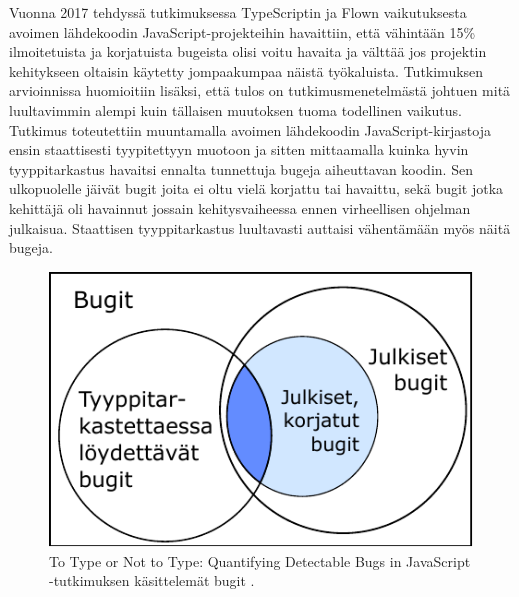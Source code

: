 Vuonna 2017 tehdyssä tutkimuksessa \cite{ToTypeOrNotToType} TypeScriptin
ja Flown vaikutuksesta avoimen
lähdekoodin JavaScript-projekteihin havaittiin, että vähintään 15\%
ilmoitetuista ja korjatuista bugeista olisi voitu havaita ja välttää jos
projektin kehitykseen oltaisin käytetty jompaakumpaa näistä työkaluista.
Tutkimuksen arvioinnissa huomioitiin lisäksi, että tulos on tutkimusmenetelmästä
johtuen mitä luultavimmin alempi kuin tällaisen muutoksen tuoma todellinen
vaikutus. Tutkimus toteutettiin muuntamalla avoimen lähdekoodin
JavaScript-kirjastoja ensin staattisesti tyypitettyyn muotoon ja sitten
mittaamalla kuinka hyvin tyyppitarkastus havaitsi ennalta tunnettuja bugeja
aiheuttavan koodin. Sen ulkopuolelle jäivät bugit joita ei oltu vielä
korjattu tai havaittu, sekä bugit jotka kehittäjä oli havainnut jossain
kehitysvaiheessa ennen virheellisen ohjelman julkaisua. Staattisen
tyyppitarkastus luultavasti auttaisi vähentämään myös näitä bugeja.

\begin{figure}
\centering
\includegraphics{images/to_type_or_not_to_type_venn.pdf}
\caption{To Type or Not to Type: Quantifying Detectable Bugs in JavaScript
         -tutkimuksen käsittelemät bugit \cite{ToTypeOrNotToType}.}
\label{fig:ToTypeOrNotToType}
\end{figure}

